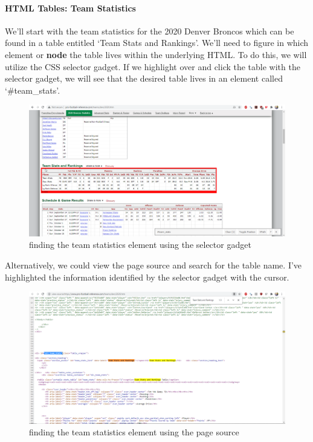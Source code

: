 \documentclass[
]{article}
\begin{document}
\hypertarget{html-tables-team-statistics}{%
\paragraph{HTML Tables: Team Statistics}\label{html-tables-team-statistics}}

We'll start with the team statistics for the 2020 Denver Broncos which can be found in a table entitled `Team Stats and Rankings'. We'll need to figure in which element or \textbf{node} the table lives within the underlying HTML. To do this, we will utilize the CSS selector gadget. If we highlight over and click the table with the selector gadget, we will see that the desired table lives in an element called `\#team\_stats'.

\begin{figure}

{\centering \includegraphics[width=22.22in]{src/images/broncos_selector_gadget} 

}

\caption{finding the team statistics element using the selector gadget}\label{fig:unnamed-chunk-27}
\end{figure}

Alternatively, we could view the page source and search for the table name. I've highlighted the information identified by the selector gadget with the cursor.

\begin{figure}

{\centering \includegraphics[width=22.22in]{src/images/broncos_page_source} 

}

\caption{finding the team statistics element using the page source}\label{fig:unnamed-chunk-28}
\end{figure}
\end{document}
